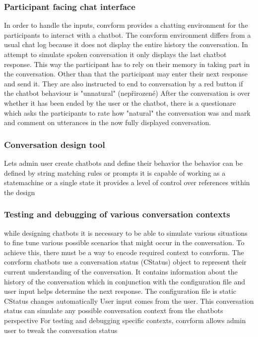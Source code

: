 \documentclass[12pt]{report}
\begin{document}
{\subsubsection{Participant facing chat interface}
In order to handle the inputs, convform provides a chatting environment
for the participants to interact with a chatbot.
The convform environment differs from a usual chat log
because it does not display
the entire history the conversation.
In attempt to simulate spoken conversation
it only displays the last chatbot response.
This way the participant has to rely on their memory
in taking part in the conversation.
Other than that the participant may enter their next response
and send it.
They are also instructed to end to conversation by a red button
if the chatbot behaviour is "unnatural" (nepřirozené)
After the conversation is over whether it has been ended by the user or the chatbot,
there is a questionare which
asks the participants to rate how "natural" the conversation was
and mark and comment on utterances in the now fully displayed conversation.

\subsubsection{Conversation design tool}
Lets admin user create chatbots and define their behavior
the behavior can be defined by string matching rules or prompts
it is capable of working as a statemachine or a single state
it provides a level of control over references within the design

\subsubsection{Testing and debugging of various conversation contexts}
while designing chatbots it is necessary
to be able to simulate various situations
to fine tune various possible scenarios
that might occur in the conversation.
To achieve this, there must be a way
to encode required context to convform.
The convform chatbots use a conversation status (CStatus) object
to represent their current understanding of the conversation.
It contains information about the history of the conversation
which in conjunction with the configuration file and user input
helps determine the next response.
The configuration file is static
CStatus changes automatically
User input comes from the user.
This conversation status can simulate any possible conversation context
from the chatbots perspective
For testing and debugging specific contexts, convform allows admin user
to tweak the conversation status

}
\end{document}
